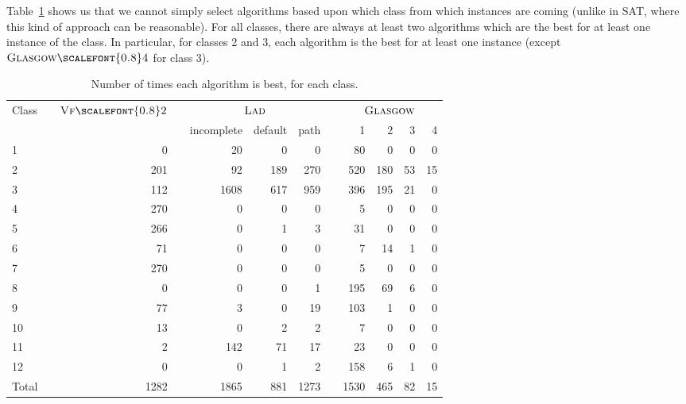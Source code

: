 \documentclass{llncs}
\newcommand{\VFtwo}{$\textsc{Vf{\scalefont{0.8}2}}$\xspace}
\newcommand{\Glasgow}{$\textsc{Glasgow}$\xspace}
\newcommand{\LAD}{$\textsc{Lad}$\xspace}
\newcommand{\GlasgowFour}{$\textsc{Glasgow{\scalefont{0.8}4}}$\xspace}
\begin{document}
Table~\ref{expClass} shows us that we cannot simply select algorithms based upon which class from
which instances are coming (unlike in SAT, where this kind of approach can be reasonable). For all
classes, there are always at least two algorithms which are the best for at least one instance of
the class. In particular, for classes 2 and 3, each algorithm is the best for at least one instance
(except \GlasgowFour for class 3).

\begin{table}[t]
\begin{center}
\begin{tabularx}{.8\textwidth}{XXrXrrrXrrrr}
\toprule
Class && \VFtwo && \multicolumn{3}{c}{\LAD} && \multicolumn{4}{c}{\hspace*{2em}\Glasgow}\\
&&&&incomplete&default&path&&1&2&3&4\\
\midrule
1 &&        0 &&       20 &        0 &        0 &&       80 &        0 &        0 &        0 \\
2 &&      201 &&       92 &      189 &      270 &&      520 &      180 &       53 &       15 \\
3 &&      112 &&     1608 &      617 &      959 &&      396 &      195 &       21 &        0 \\
4 &&      270 &&        0 &        0 &        0 &&        5 &        0 &        0 &        0 \\
5 &&      266 &&        0 &        1 &        3 &&       31 &        0 &        0 &        0 \\
6 &&       71 &&        0 &        0 &        0 &&        7 &       14 &        1 &        0 \\
7 &&      270 &&        0 &        0 &        0 &&        5 &        0 &        0 &        0 \\
8 &&        0 &&        0 &        0 &        1 &&      195 &       69 &        6 &        0 \\
9 &&       77 &&        3 &        0 &       19 &&      103 &        1 &        0 &        0 \\
10 &&       13 &&        0 &        2 &        2 &&        7 &        0 &        0 &        0 \\
11 &&        2 &&      142 &       71 &       17 &&       23 &        0 &        0 &        0 \\
12 &&        0 &&        0 &        1 &        2 &&      158 &        6 &        1 &        0 \\
\midrule
Total && 1282 && 1865 & 881 & 1273 && 1530 & 465 & 82& 15\\
\bottomrule
\end{tabularx}
\end{center}
\caption{Number of times each algorithm is best, for each class.\label{expClass}}
\end{table}
\end{document}
